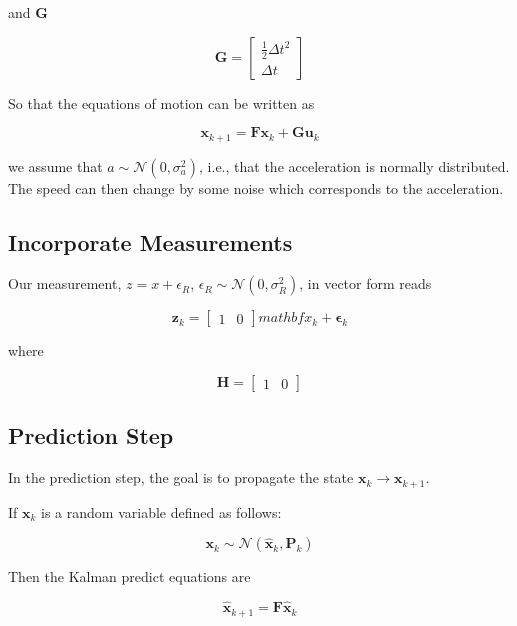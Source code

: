 \documentclass{article}
\begin{document}
and $\mathbf{G}$

\[
\mathbf{G} =
\begin{bmatrix}
\frac{1}{2} \Delta t^2 \\
\Delta t
\end{bmatrix}
\]

So that the equations of motion can be written as

\begin{equation}
\mathbf{x}_{k+1} = \mathbf{F} \mathbf{x}_k + \mathbf{G} \mathbf{u}_k
\end{equation}

we assume that $a \sim \mathcal{N}(0, \sigma_a^2)$, i.e., that the acceleration is normally distributed. The speed can then change by some noise which corresponds to the acceleration.

\subsection{Incorporate Measurements}

Our measurement, $z = x + \epsilon_R$, $\epsilon_R \sim \mathcal{N}(0, \sigma_R^2)$, in vector form reads

\[
\mathbf{z}_k =
\begin{bmatrix}
1 & 0
\end{bmatrix}
mathbf{x}_k + \bm{\epsilon}_k
\]

where

\[
\mathbf{H} =
\begin{bmatrix}
1 & 0
\end{bmatrix}
\]

\subsection{Prediction Step}

In the prediction step, the goal is to propagate the state $\mathbf{x}_k \rightarrow \mathbf{x}_{k+1}$.

If $\mathbf{x}_k$ is a random variable defined as follows:

\begin{equation}
\mathbf{x}_k \sim \mathcal{N}(\hat{\mathbf{x}}_k, \mathbf{P}_k)
\end{equation}

Then the Kalman predict equations are

\begin{equation}
\hat{\mathbf{x}}_{k+1} = \mathbf{F} \hat{\mathbf{x}}_{k}
\end{equation}
\end{document}
